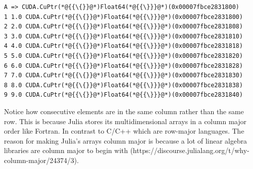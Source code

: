 \documentclass[12pt,a4paper]{article}
\begin{document}
\begin{lstlisting}
A => CUDA.CuPtr(*@{{\{}}@*)Float64(*@{{\}}}@*)(0x00007fbce2831800)
1 1.0 CUDA.CuPtr(*@{{\{}}@*)Float64(*@{{\}}}@*)(0x00007fbce2831800)
2 2.0 CUDA.CuPtr(*@{{\{}}@*)Float64(*@{{\}}}@*)(0x00007fbce2831808)
3 3.0 CUDA.CuPtr(*@{{\{}}@*)Float64(*@{{\}}}@*)(0x00007fbce2831810)
4 4.0 CUDA.CuPtr(*@{{\{}}@*)Float64(*@{{\}}}@*)(0x00007fbce2831818)
5 5.0 CUDA.CuPtr(*@{{\{}}@*)Float64(*@{{\}}}@*)(0x00007fbce2831820)
6 6.0 CUDA.CuPtr(*@{{\{}}@*)Float64(*@{{\}}}@*)(0x00007fbce2831828)
7 7.0 CUDA.CuPtr(*@{{\{}}@*)Float64(*@{{\}}}@*)(0x00007fbce2831830)
8 8.0 CUDA.CuPtr(*@{{\{}}@*)Float64(*@{{\}}}@*)(0x00007fbce2831838)
9 9.0 CUDA.CuPtr(*@{{\{}}@*)Float64(*@{{\}}}@*)(0x00007fbce2831840)
\end{lstlisting}


Notice how consecutive elements are in the same column rather than the same row. This is because Julia stores its multidimensional arrays in a column major order like Fortran. In contrast to C/C++ which are row-major languages. The reason for making Julia's arrays column major is because a lot of linear algebra libraries are column major to begin with (https://discourse.julialang.org/t/why-column-major/24374/3).
\end{document}

